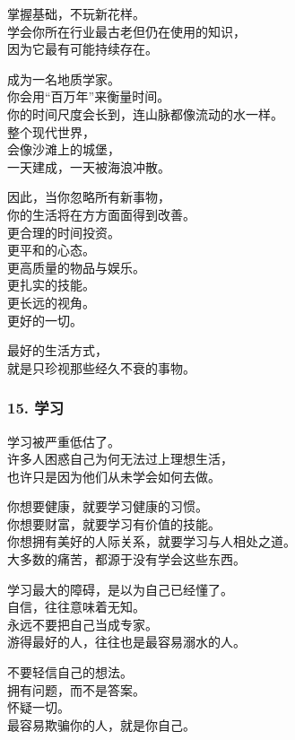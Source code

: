 \documentclass[
]{article}
\begin{document}
掌握基础，不玩新花样。\\
学会你所在行业最古老但仍在使用的知识，\\
因为它最有可能持续存在。

成为一名地质学家。\\
你会用``百万年''来衡量时间。\\
你的时间尺度会长到，连山脉都像流动的水一样。\\
整个现代世界，\\
会像沙滩上的城堡，\\
一天建成，一天被海浪冲散。

因此，当你忽略所有新事物，\\
你的生活将在方方面面得到改善。\\
更合理的时间投资。\\
更平和的心态。\\
更高质量的物品与娱乐。\\
更扎实的技能。\\
更长远的视角。\\
更好的一切。

最好的生活方式，\\
就是只珍视那些经久不衰的事物。

\subsubsection{\texorpdfstring{15. 学习
}{15. 学习 }}\label{15-ux5b66ux4e60}

学习被严重低估了。\\
许多人困惑自己为何无法过上理想生活，\\
也许只是因为他们从未学会如何去做。

你想要健康，就要学习健康的习惯。\\
你想要财富，就要学习有价值的技能。\\
你想拥有美好的人际关系，就要学习与人相处之道。\\
大多数的痛苦，都源于没有学会这些东西。

学习最大的障碍，是以为自己已经懂了。\\
自信，往往意味着无知。\\
永远不要把自己当成专家。\\
游得最好的人，往往也是最容易溺水的人。

不要轻信自己的想法。\\
拥有问题，而不是答案。\\
怀疑一切。\\
最容易欺骗你的人，就是你自己。
\end{document}
